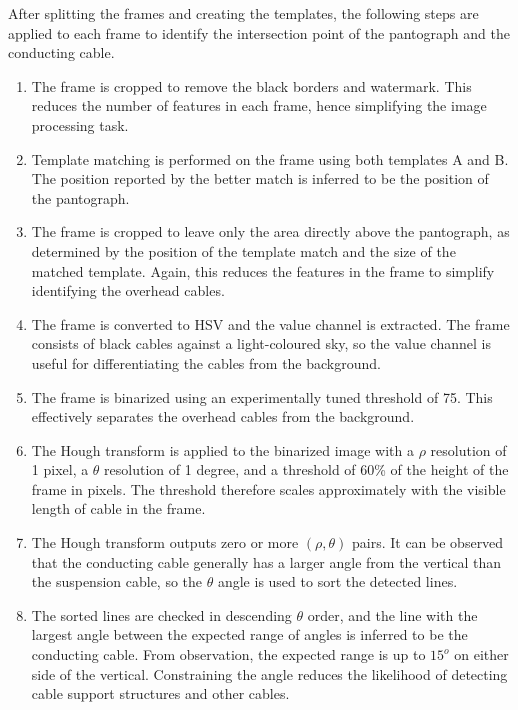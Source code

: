 After splitting the frames and creating the templates, the following steps are applied to each frame to identify the intersection point of the pantograph and the conducting cable.
\begin{enumerate}
  \item The frame is cropped to remove the black borders and watermark. This reduces the number of features in each frame, hence simplifying the image processing task.

  \item Template matching is performed on the frame using both templates A and B. The position reported by the better match is inferred to be the position of the pantograph.

  \item The frame is cropped to leave only the area directly above the pantograph, as determined by the position of the template match and the size of the matched template. Again, this reduces the features in the frame to simplify identifying the overhead cables.

  \item The frame is converted to HSV and the value channel is extracted. The frame consists of black cables against a light-coloured sky, so the value channel is useful for differentiating the cables from the background.

  \item The frame is binarized using an experimentally tuned threshold of 75. This effectively separates the overhead cables from the background.

  \item The Hough transform is applied to the binarized image with a $\rho$ resolution of 1 pixel, a $\theta$ resolution of 1 degree, and a threshold of 60\% of the height of the frame in pixels. The threshold therefore scales approximately with the visible length of cable in the frame.

  \item The Hough transform outputs zero or more $(\rho,\theta)$ pairs. It can be observed that the conducting cable generally has a larger angle from the vertical than the suspension cable, so the $\theta$ angle is used to sort the detected lines.

  \item The sorted lines are checked in descending $\theta$ order, and the line with the largest angle between the expected range of angles is inferred to be the conducting cable. From observation, the expected range is up to $15^o$ on either side of the vertical. Constraining the angle reduces the likelihood of detecting cable support structures and other cables.


\end{enumerate}

